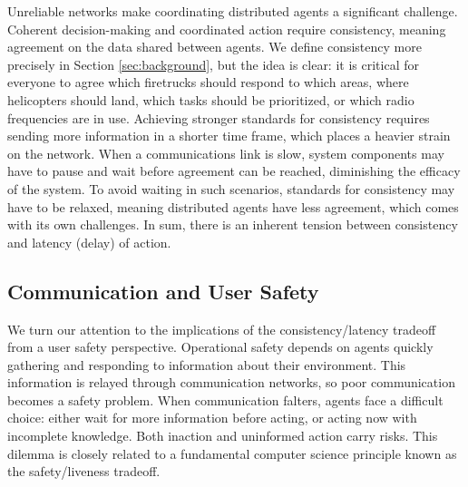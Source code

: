 \documentclass[]             %
{NASA}                       %
\theoremstyle{definition}
\begin{document}
Unreliable networks make coordinating distributed agents a significant
challenge. Coherent decision-making and coordinated action require
consistency, meaning agreement on the data shared between agents. We
define consistency more precisely in Section \ref{sec:background}, but
the idea is clear: it is critical for everyone to agree which
firetrucks should respond to which areas, where helicopters should
land, which tasks should be prioritized, or which radio frequencies
are in use. Achieving stronger standards for consistency requires
sending more information in a shorter time frame, which places a
heavier strain on the network. When a communications link is slow,
system components may have to pause and wait before agreement can be
reached, diminishing the efficacy of the system. To avoid waiting in
such scenarios, standards for consistency may have to be relaxed,
meaning distributed agents have less agreement, which comes with its
own challenges. In sum, there is an inherent tension between
consistency and latency (delay) of action.

\subsection{Communication and User Safety}
\label{ssec:communication-and-safety}
We turn our attention to the implications of the consistency/latency
tradeoff from a user safety perspective. Operational safety depends on
agents quickly gathering and responding to information about their
environment. This information is relayed through communication
networks, so poor communication becomes a safety problem. When
communication falters, agents face a difficult choice: either wait for
more information before acting, or acting now with incomplete %
knowledge. Both inaction and uninformed action carry risks. This
dilemma is closely related to a fundamental computer science principle
known as the safety/liveness tradeoff.
\end{document}
